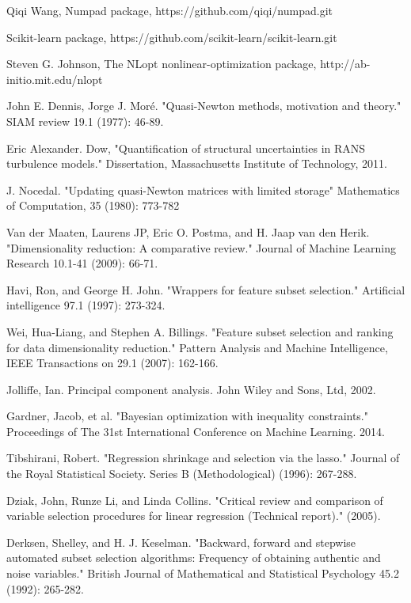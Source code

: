 \documentclass[a4paper,onecolumn]{article}
\theoremstyle{remark}
\begin{document}
\begin{thebibliography}{9}
Qiqi Wang,
Numpad package,
https://github.com/qiqi/numpad.git

Scikit-learn package,
https://github.com/scikit-learn/scikit-learn.git

Steven G. Johnson,
The NLopt nonlinear-optimization package, 
http://ab-initio.mit.edu/nlopt

John E. Dennis, Jorge J. Moré.
"Quasi-Newton methods, motivation and theory." SIAM review 19.1 (1977): 46-89.

Eric Alexander. Dow,
"Quantification of structural uncertainties in RANS turbulence models."
Dissertation, Massachusetts Institute of Technology, 2011.

J. Nocedal.
"Updating quasi-Newton matrices with limited storage"
Mathematics of Computation, 35 (1980): 773-782

Van der Maaten, Laurens JP, Eric O. Postma, and H. Jaap van den Herik. 
"Dimensionality reduction: A comparative review." 
Journal of Machine Learning Research 10.1-41 (2009): 66-71.

Havi, Ron, and George H. John. 
"Wrappers for feature subset selection."
Artificial intelligence 97.1 (1997): 273-324.

Wei, Hua-Liang, and Stephen A. Billings. 
"Feature subset selection and ranking for data dimensionality reduction." 
Pattern Analysis and Machine Intelligence, IEEE Transactions on 29.1 (2007): 162-166.

Jolliffe, Ian. Principal component analysis. John Wiley and Sons, Ltd, 2002.

Gardner, Jacob, et al. 
"Bayesian optimization with inequality constraints."
Proceedings of The 31st International Conference on Machine Learning. 2014.

Tibshirani, Robert. 
"Regression shrinkage and selection via the lasso." 
Journal of the Royal Statistical Society. Series B (Methodological) (1996): 267-288.

Dziak, John, Runze Li, and Linda Collins. 
"Critical review and comparison of variable selection procedures for linear regression (Technical report)." (2005).

Derksen, Shelley, and H. J. Keselman. 
"Backward, forward and stepwise automated subset selection algorithms: Frequency of obtaining authentic and noise variables." 
British Journal of Mathematical and Statistical Psychology 45.2 (1992): 265-282.


\end{thebibliography}
\end{document}
